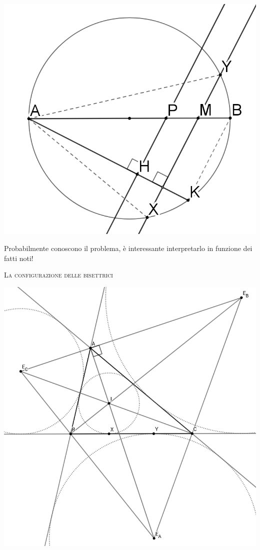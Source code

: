 \documentclass[a4paper]{article}
\theoremstyle{remark}
\theoremstyle{definition}
\begin{document}
\begin{multicols}{2}
 \begin{center}
 	\includegraphics[scale=0.20]{Febb17}
 \end{center}
 
 \textsf{Probabilmente conoscono il problema, è interessante interpretarlo in funzione dei fatti noti!}


\columnbreak
\vspace{0.5 cm}
\begin{center}
	\textsc{La configurazione delle bisettrici}
\end{center}

\begin{center}
	\includegraphics[scale=0.20]{nmode}
\end{center}



\end{multicols}
\end{document}
